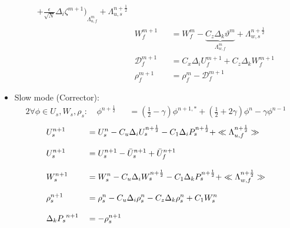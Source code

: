 \documentclass[a4paper]{article}
\numberwithin{equation}{section}
\begin{document}
\begin{itemize}[label=\textbullet,font=\tiny]
\begin{equation}
\begin{split}
{          +\frac{\epsilon}{\sqrt{N}} \Delta_i\zeta^{m+1} \big)}
         _{\Lambda_{u,f}^m}
    +\Lambda_{u,s}^{n+\frac{1}{2}} \\[3mm]
    &W_f^{m+1} &&=W_f^{m}
    -\underbrace{C_z\Delta_k\vartheta^{m}}_{\Lambda_{w,f}^m}
    +\Lambda_{w,s}^{n+\frac{1}{2}}\\[3mm]
    &\mathcal{D}_f^{m+1} &&=
    C_x\Delta_i{U_f^{m+1}}+C_z\Delta_k{W_f^{m+1}}\\[3mm]
    &\rho_f^{m+1} &&= \rho_f^{m}-\mathcal{D}_f^{m+1}   
   \end{split}
\end{equation}
   
\item Slow mode (Corrector):
   \begin{alignat}{2}
   \displaystyle
    \nonumber\forall\phi\in{U_s,W_s,\rho_s}:\ 
    &\phi^{n+\frac{1}{2}} &&=(\frac{1}{2}-\gamma)\phi^{n+1,*}
    +(\frac{1}{2}+2\gamma)\phi^{n}-\gamma\phi^{n-1}
   \end{alignat}
   \begin{equation}
   \begin{split}
   \displaystyle
    &U_s^{n+1} &&=U_s^{n}
    -C_u\Delta_i{U_s^{n+\frac{1}{2}}}
    -C_1\Delta_i{P_s^{n+\frac{1}{2}}}
    +\ll\Lambda_{u,f}^{n+\frac{1}{2}}\gg\\[3mm]
    &U_s^{n+1}&&=U_s^{n+1}-\bar{U}_s^{n+1}+\bar{U}_f^{n+1}\\[3mm]
    &W_s^{n+1} &&=W_s^{n}
    -C_u\Delta_i{W_s^{n+\frac{1}{2}}}
    -C_1\Delta_k{P_s^{n+\frac{1}{2}}}
    +\ll\Lambda_{w,f}^{n+\frac{1}{2}}\gg\\[3mm]
    &\rho_s^{n+1} &&=\rho_s^{n}
    -C_u\Delta_i{\rho_s^{n}}-C_z\Delta_k{\rho_s^{n}}
    +C_1 W_s^{n}\\[3mm]
    &\Delta_k{P_s}^{n+1} &&=-\rho_s^{n+1}
   \end{split}
   \end{equation}
   

\end{itemize}
\end{document}
